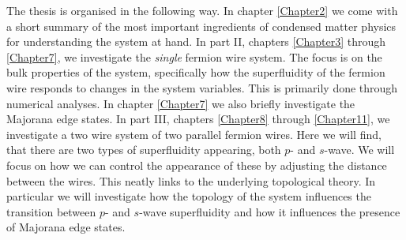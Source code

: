 \newpage
The thesis is organised in the following way. In chapter \ref{Chapter2} we come with a short summary of the most important ingredients of condensed matter physics for understanding the system at hand. In part II, chapters \ref{Chapter3} through \ref{Chapter7}, we investigate the \textit{single} fermion wire system. The focus is on the bulk properties of the system, specifically how the superfluidity of the fermion wire responds to changes in the system variables. This is primarily done through numerical analyses. In chapter \ref{Chapter7} we also briefly investigate the Majorana edge states. In part III, chapters \ref{Chapter8} through \ref{Chapter11}, we investigate a two wire system of two parallel fermion wires. Here we will find, that there are two types of superfluidity appearing, both $p$- and $s$-wave. We will focus on how we can control the appearance of these by adjusting the distance between the wires. This neatly links to the underlying topological theory. In particular we will investigate how the topology of the system influences the transition between $p$- and $s$-wave superfluidity and how it influences the presence of Majorana edge states. 